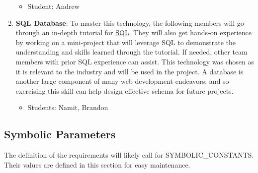 \documentclass{article}
\begin{document}
\begin{enumerate}
        \begin{itemize}
                \item Student: Andrew 
            \end{itemize}
    \item \textbf{SQL Database}: To master this technology, the following members will go through an in-depth tutorial for \href{https://www.w3schools.com/sql/default.asp}{SQL}. They will also get hands-on experience by working on a mini-project that will leverage SQL to demonstrate the understanding and skills learned through the tutorial. If needed, other team members with prior SQL experience can assist. This technology was chosen as it is relevant to the industry and will be used in the project. A database is another large component of many web development endeavors, and so exercising this skill can help design effective schema for future projects.
        \begin{itemize}
                \item Students: Namit, Brandon
            \end{itemize}
\end{enumerate}


\subsection{Symbolic Parameters}

The definition of the requirements will likely call for SYMBOLIC\_CONSTANTS.
Their values are defined in this section for easy maintenance.
\end{document}
